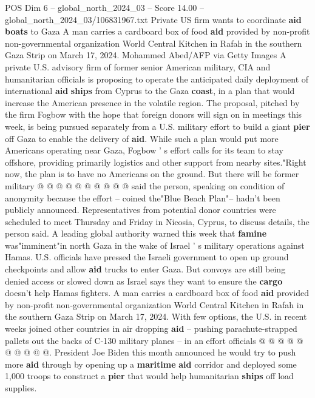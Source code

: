 \begin{textsample}{POS Dim 6 – global\_north\_2024\_03 – Score 14.00 – global\_north\_2024\_03/106831967.txt}  \label{ex:f6_pos_046}
Private US firm wants to coordinate \textbf{aid} \textbf{boats} to Gaza A man carries a cardboard box of food \textbf{aid} provided by non-profit non-governmental organization World Central Kitchen in Rafah in the southern Gaza Strip on March 17, 2024.
Mohammed Abed/AFP via Getty Images A private U.S. advisory firm of former senior American military, CIA and humanitarian officials is proposing to operate the anticipated daily deployment of international \textbf{aid} \textbf{ships} from Cyprus to the Gaza \textbf{coast}, in a plan that would increase the American presence in the volatile region.
The proposal, pitched by the firm Fogbow with the hope that foreign donors will sign on in meetings this week, is being pursued separately from a U.S. military effort to build a giant \textbf{pier} off Gaza to enable the delivery of \textbf{aid}.
While such a plan would put more Americans operating near Gaza, Fogbow ' s effort calls for its team to stay offshore, providing primarily logistics and other support from nearby sites."Right now, the plan is to have no Americans on the ground.
But there will be former military @ @ @ @ @ @ @ @ @ @ said the person, speaking on condition of anonymity because the effort -- coined the"Blue Beach Plan"-- hadn't been publicly announced.
Representatives from potential donor countries were scheduled to meet Thursday and Friday in Nicosia, Cyprus, to discuss details, the person said.
A leading global authority warned this week that \textbf{famine} was"imminent"in north Gaza in the wake of Israel ' s military operations against Hamas.
U.S. officials have pressed the Israeli government to open up ground checkpoints and allow \textbf{aid} trucks to enter Gaza.
But convoys are still being denied access or slowed down as Israel says they want to ensure the \textbf{cargo} doesn't help Hamas fighters.
A man carries a cardboard box of food \textbf{aid} provided by non-profit non-governmental organization World Central Kitchen in Rafah in the southern Gaza Strip on March 17, 2024.
With few options, the U.S. in recent weeks joined other countries in air dropping \textbf{aid} -- pushing parachute-strapped pallets out the backs of C-130 military planes -- in an effort officials @ @ @ @ @ @ @ @ @ @.
President Joe Biden this month announced he would try to push more \textbf{aid} through by opening up a \textbf{maritime} \textbf{aid} corridor and deployed some 1,000 troops to construct a \textbf{pier} that would help humanitarian \textbf{ships} off load supplies.

\end{textsample}
